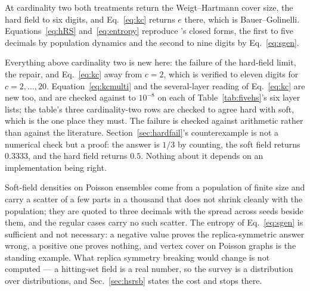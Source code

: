 At cardinality two both treatments return the Weigt--Hartmann cover size, the
hard field to six digits, and Eq.~\eqref{eq:kc} returns $e$ there, which is
Bauer--Golinelli. Equations~\eqref{eq:hRS} and~\eqref{eq:entropy} reproduce
\citeauthor{mezard2007}'s closed forms, the first to five decimals by population
dynamics and the second to nine digits by Eq.~\eqref{eq:sgen}.

Everything above cardinality two is new here: the failure of the hard-field
limit, the repair, and Eq.~\eqref{eq:kc} away from $c=2$, which is verified to
eleven digits for $c=2,\dots,20$. Equation~\eqref{eq:kcmulti} and the several-layer
reading of Eq.~\eqref{eq:kc} are new too, and are checked against
 to $10^{-8}$ on each of Table~\ref{tab:fivehs}'s
six layer lists; the table's three cardinality-two rows are checked to agree
hard with soft, which is the one place they must. The failure is checked against arithmetic
rather than against the literature. Section~\ref{sec:hardfail}'s counterexample
is not a numerical check but a proof: the answer is $1/3$ by counting, the soft
field returns $0.3333$, and the hard field returns $0.5$. Nothing about it
depends on an implementation being right.

Soft-field densities on Poisson ensembles come from a population of finite size
and carry a scatter of a few parts in a thousand that does not shrink cleanly
with the population; they are quoted to three decimals with the spread across
seeds beside them, and the regular cases carry no such scatter. The entropy of
Eq.~\eqref{eq:sgen} is sufficient and not necessary: a negative value proves the
replica-symmetric answer wrong, a positive one proves nothing, and vertex cover
on Poisson graphs is the standing example. What replica symmetry breaking would
change is not computed --- a hitting-set field is a real number, so the survey is
a distribution over distributions, and Sec.~\ref{sec:hsrsb} states the cost and
stops there.
